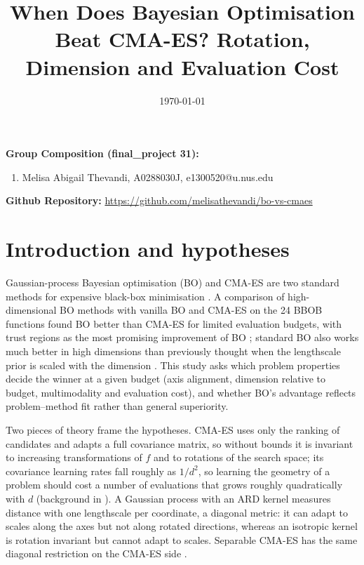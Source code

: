 \documentclass[10pt,a4paper,twocolumn]{article}
\begin{document}
\title{When Does Bayesian Optimisation Beat CMA-ES? Rotation, Dimension and Evaluation Cost}
\author{}
\date{\today}
\maketitle

{\bf Group Composition (final\_project 31):}
\begin{enumerate}
\item Melisa Abigail Thevandi, A0288030J, e1300520@u.nus.edu
\end{enumerate}

{\bf Github Repository:} \url{https://github.com/melisathevandi/bo-vs-cmaes}

\section{Introduction and hypotheses}
Gaussian-process Bayesian optimisation (BO) and CMA-ES are two standard methods for expensive black-box minimisation
\citep{frazier2018tutorial,hansen2016tutorial}. A comparison of high-dimensional BO methods with vanilla BO and CMA-ES
on the 24 BBOB functions found BO better than CMA-ES for limited evaluation budgets, with trust regions as the most
promising improvement of BO \citep{santoni2024hdbo}; standard BO also works much better in high dimensions than
previously thought when the lengthscale prior is scaled with the dimension \citep{hvarfner2024vanilla}. This study asks
which problem properties decide the winner at a given budget (axis alignment, dimension relative to budget,
multimodality and evaluation cost), and whether BO's advantage reflects problem--method fit rather than general
superiority.

Two pieces of theory frame the hypotheses. CMA-ES uses only the ranking of candidates and adapts a full covariance
matrix, so without bounds it is invariant to increasing transformations of $f$ and to rotations of the search space;
its covariance learning rates fall roughly as $1/d^2$, so learning the geometry of a problem should cost a number of
evaluations that grows roughly quadratically with $d$ (background in \citep{hansen2016tutorial}). A Gaussian process with
an ARD kernel measures distance with one lengthscale per coordinate, a diagonal metric: it can adapt to scales along the
axes but not along rotated directions, whereas an isotropic kernel is rotation invariant but cannot adapt to scales.
Separable CMA-ES has the same diagonal restriction on the CMA-ES side \citep{ros2008sepcma}.
\end{document}
